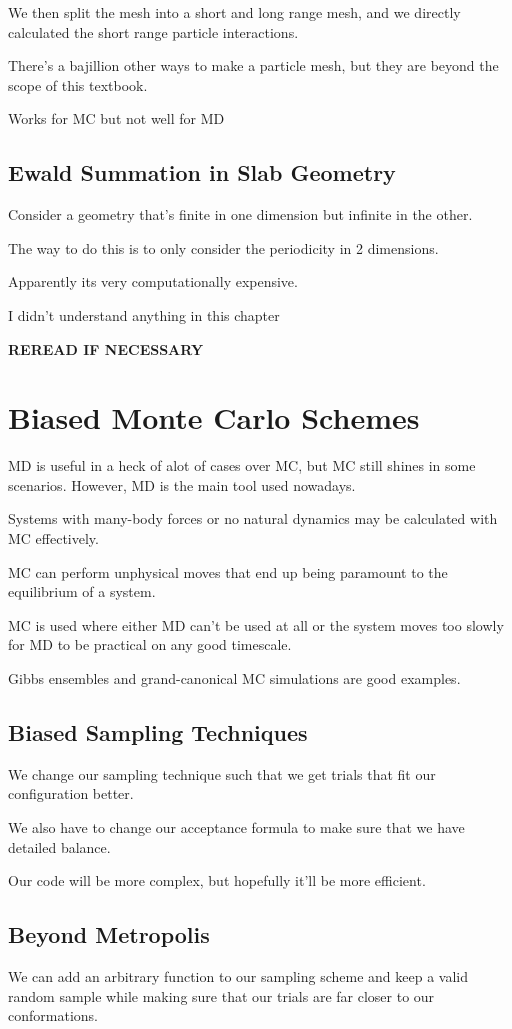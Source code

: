 \documentclass[fleqn]{report}
\begin{document}
We then split the mesh into a short and long range mesh, and we directly 
calculated the short range particle interactions. 

There's a bajillion other ways to make a particle mesh, but they are 
beyond the scope of this textbook. 

Works for MC but not well for MD 

\section{Ewald Summation in Slab Geometry}
Consider a geometry that's finite in one dimension but infinite 
in the other. 

The way to do this is to only consider the periodicity in 2 dimensions. 

Apparently its very computationally expensive. 

I didn't understand anything in this chapter 

\textbf{REREAD IF NECESSARY}

\chapter{Biased Monte Carlo Schemes}
MD is useful in a heck of alot of cases over MC, but MC still 
shines in some scenarios. However, MD is the main tool used nowadays. 

Systems with many-body forces or no natural dynamics may be calculated 
with MC effectively. 

MC can perform unphysical moves that end up being paramount to the 
equilibrium of a system. 

MC is used where either MD can't be used at all or the system moves too 
slowly for MD to be practical on any good timescale.

Gibbs ensembles and grand-canonical MC simulations are good examples. 

\section{Biased Sampling Techniques}
We change our sampling technique such that we get trials that fit our 
configuration better. 

We also have to change our acceptance formula to make sure that we 
have detailed balance. 

Our code will be more complex, but hopefully it'll be more efficient. 

\section{Beyond Metropolis}
We can add an arbitrary function to our sampling scheme and keep a valid 
random sample while making sure that our trials are far closer to our 
conformations. 
\end{document}
